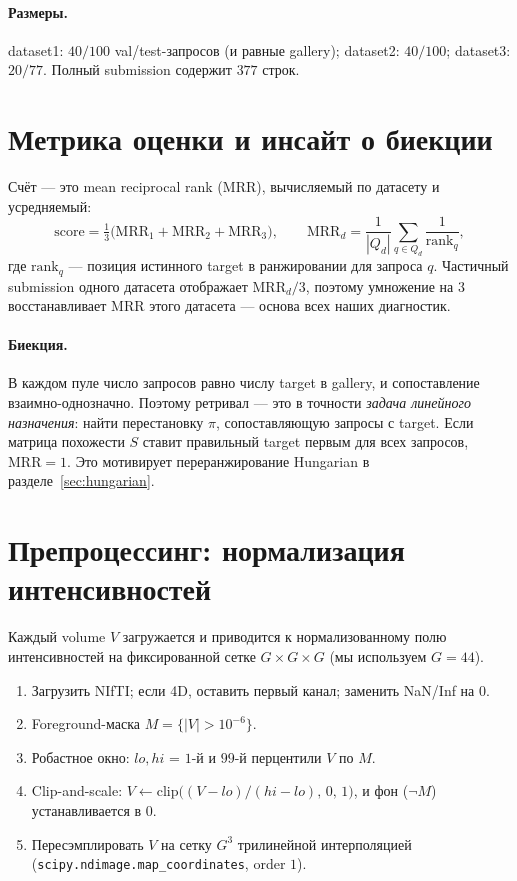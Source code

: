 \documentclass[11pt]{article}
\newcommand{\code}[1]{\texttt{#1}}
\begin{document}
\paragraph{Размеры.} dataset1: $40/100$ val/test-запросов (и равные gallery);
dataset2: $40/100$; dataset3: $20/77$. Полный submission содержит $377$ строк.

\section{Метрика оценки и инсайт о биекции}

Счёт — это mean reciprocal rank (MRR), вычисляемый по датасету и усредняемый:
\begin{equation}
\text{score} = \tfrac{1}{3}\big(\text{MRR}_{1}+\text{MRR}_{2}+\text{MRR}_{3}\big),
\qquad
\text{MRR}_d = \frac{1}{|Q_d|}\sum_{q\in Q_d}\frac{1}{\text{rank}_q},
\end{equation}
где $\text{rank}_q$ — позиция истинного target в ранжировании для запроса
$q$. Частичный submission одного датасета отображает $\text{MRR}_d/3$, поэтому умножение
на $3$ восстанавливает MRR этого датасета --- основа всех наших диагностик.

\paragraph{Биекция.} В каждом пуле число запросов равно числу target в gallery, и
сопоставление взаимно-однозначно. Поэтому ретривал — это в точности
\emph{задача линейного назначения}: найти перестановку $\pi$, сопоставляющую запросы
с target. Если матрица похожести $S$ ставит правильный target первым для всех запросов,
$\text{MRR}=1$. Это мотивирует переранжирование Hungarian в
разделе~\ref{sec:hungarian}.

\section{Препроцессинг: нормализация интенсивностей}\label{sec:prep}

Каждый volume $V$ загружается и приводится к нормализованному полю интенсивностей на
фиксированной сетке $G\times G\times G$ (мы используем $G=44$).

\begin{enumerate}[nosep]
  \item Загрузить NIfTI; если 4D, оставить первый канал; заменить NaN/Inf на $0$.
  \item Foreground-маска $M=\{|V|>10^{-6}\}$.
  \item Робастное окно: $lo,hi$ = $1$-й и $99$-й перцентили $V$ по $M$.
  \item Clip-and-scale: $V \leftarrow \mathrm{clip}\!\big((V-lo)/(hi-lo),\,0,\,1\big)$,
        и фон ($\lnot M$) устанавливается в $0$.
  \item Пересэмплировать $V$ на сетку $G^3$ трилинейной интерполяцией
        (\code{scipy.ndimage.map\_coordinates}, order $1$).
\end{enumerate}
\end{document}
